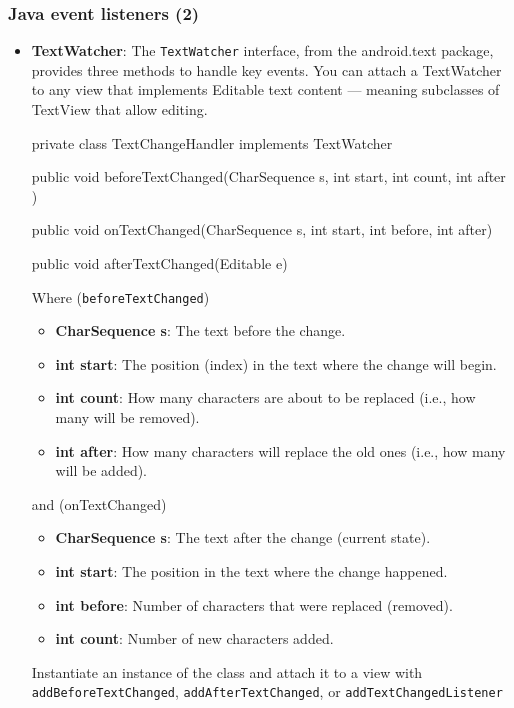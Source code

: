 \documentclass{report}
\begin{document}
    \subsubsection{Java event listeners (2)}
    \begin{itemize}
        \item \textbf{TextWatcher}: The \texttt{TextWatcher} interface, from the android.text package, provides three methods to handle key events.
            \bigbreak \noindent 
            You can attach a TextWatcher to any view that implements Editable text content — meaning subclasses of TextView that allow editing.
            \bigbreak \noindent 
            \begin{javacode}
                private class TextChangeHandler implements TextWatcher {
                    public void beforeTextChanged(CharSequence s, int start, int count, int after )

                    public void onTextChanged(CharSequence s, int start, int before, int after)

                    public void afterTextChanged(Editable e)
                }
            \end{javacode}
            Where (\texttt{beforeTextChanged})
            \begin{itemize}
                \item \textbf{CharSequence s}: The text before the change.
                \item \textbf{int start}: The position (index) in the text where the change will begin.
                \item \textbf{int count}: How many characters are about to be replaced (i.e., how many will be removed).
                \item \textbf{int after}: How many characters will replace the old ones (i.e., how many will be added).
            \end{itemize}
            and (onTextChanged)
            \begin{itemize}
                \item \textbf{CharSequence s}: The text after the change (current state).
                \item \textbf{int start}: The position in the text where the change happened.
                \item \textbf{int before}: Number of characters that were replaced (removed).
                \item \textbf{int count}: Number of new characters added.
            \end{itemize}
            \bigbreak \noindent 
            Instantiate an instance of the class and attach it to a view with \texttt{addBeforeTextChanged}, \texttt{addAfterTextChanged}, or \texttt{addTextChangedListener}


\end{itemize}
\end{document}
